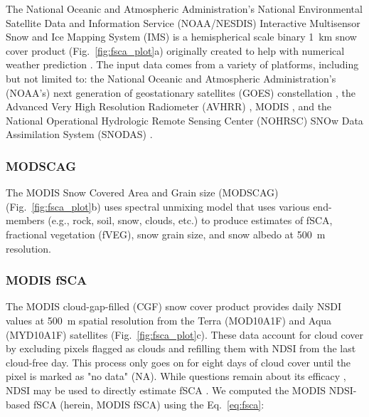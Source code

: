 The National Oceanic and Atmospheric Administration’s National Environmental Satellite Data and Information Service (NOAA/NESDIS) Interactive Multisensor Snow and Ice Mapping System (IMS) is a hemispherical scale binary 1~km snow cover product (Fig.~\ref{fig:fsca_plot}a) originally created to help with numerical weather prediction 
\citep{ramsayInteractiveMultisensorSnow1998, helfrichEnhancementsForthcomingDevelopments2007}. The input data comes from a variety of platforms, including but not limited to: the National Oceanic and Atmospheric Administration's (NOAA's) next generation of geostationary satellites (GOES) constellation \citep{menzelIntroducingGOESIFirst1994}, the Advanced Very High Resolution Radiometer (AVHRR) \citep{cracknellAdvancedVeryHigh1997}, MODIS \citep{salomonsonMODISAdvancedFacility1989}, and the National Operational Hydrologic Remote Sensing Center (NOHRSC) SNOw Data Assimilation System (SNODAS) \citep{barrettNationalOperationalHydrologic2003}.

\hypertarget{ch4-methods-4}{\subsubsection{MODSCAG}\label{ch4-methods-4}}

The MODIS Snow Covered Area and Grain size (MODSCAG) (Fig.~\ref{fig:fsca_plot}b) \citep{painterRetrievalSubpixelSnow2009} uses spectral unmixing model that uses various end-members (e.g., rock, soil, snow, clouds, etc.) to produce estimates of fSCA, fractional vegetation (fVEG), snow grain size, and snow albedo at 500~m resolution.

\hypertarget{ch4-methods-5}{\subsubsection{MODIS fSCA}\label{ch4-methods-5}}

The MODIS cloud-gap-filled (CGF) snow cover product \citep{hallEvaluationMODISVIIRS2019} provides daily NSDI values at 500~m spatial resolution from the Terra (MOD10A1F) and Aqua (MYD10A1F) satellites (Fig.~\ref{fig:fsca_plot}c). These data account for cloud cover by excluding pixels flagged as clouds and refilling them with NDSI from the last cloud-free day. This process only goes on for eight days of cloud cover until the pixel is marked as "no data" (NA). While questions remain about its efficacy \citep{nolinRecentAdvancesRemote2010, rittgerAssessmentMethodsMapping2013}, NDSI may be used to directly estimate fSCA \citep{salomonsonEstimatingFractionalSnow2004, salomonsonDevelopmentAquaMODIS2006,stillingerLandsatMODISVIIRS2023}. We computed the MODIS NDSI-based fSCA (herein, MODIS fSCA) using the Eq.~\ref{eq:fsca}:

